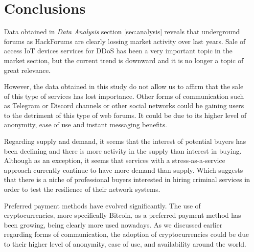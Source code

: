\chapter{Conclusions}
\label{chapter:conclusions}

Data obtained in \textit{Data Analysis} section \ref{sec:analysis} reveals that underground forums as HackForums are clearly lossing market activity over last years. Sale of access IoT devices services for DDoS has been a very important topic in the market section, but the current trend is downward and it is no longer a topic of great relevance. 

However, the data obtained in this study do not allow us to affirm that the sale of this type of services has lost importance. Other forms of communication such as Telegram or Discord channels or other social networks could be gaining users to the detriment of this type of web forums. It could be due to its higher level of anonymity, ease of use and instant messaging benefits.

Regarding supply and demand, it seems that the interest of potential buyers has been declining and there is more activity in the supply than interest in buying. Although as an exception, it seems that services with a stress-as-a-service approach currently continue to have more demand than supply. Which suggests that there is a niche of professional buyers interested in hiring criminal services in order to test the resilience of their network systems.

Preferred payment methods have evolved significantly. The use of cryptocurrencies, more specifically Bitcoin, as a preferred payment method has been growing, being clearly more used nowadays. As we discussed earlier regarding forms of communication, the adoption of cryptocurrencies could be due to their higher level of anonymity, ease of use, and availability around the world. 
